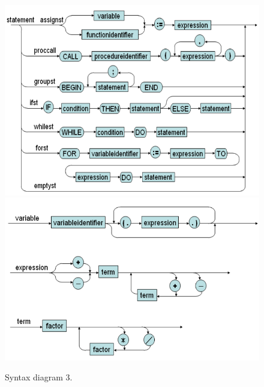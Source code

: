 \documentclass[12pt, a4paper]{report}
\begin{document}
				\begin{figure}[hp]
					\includegraphics[width=\linewidth]{syn5.png}
					\includegraphics[width=\linewidth]{syn6.png}
					\caption{Syntax diagram 3.}
					\label{fig:syn3}
				\end{figure}
\end{document}
